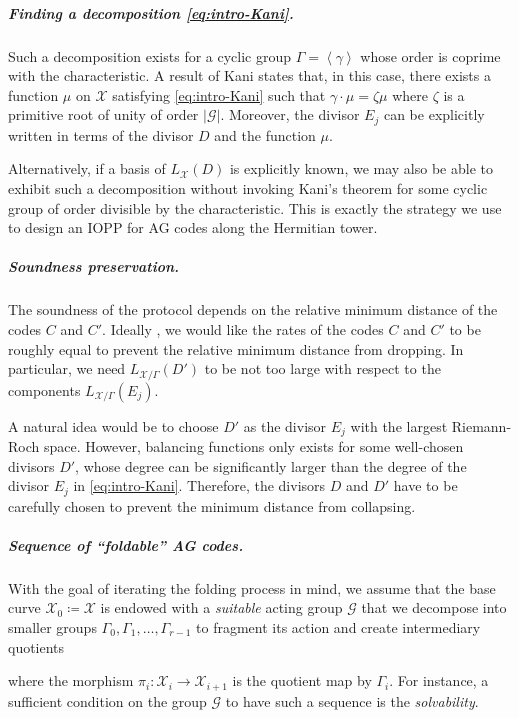 \documentclass[10pt,a4paper]{article}
\newcommand\gen[1]{\left\langle #1 \right\rangle}
\newcommand{\size}[1]{\left|#1\right|}
\newcommand\calX{\mathcal{X}}
\newcommand\calG{\mathcal{G}}
\newcommand\mydef{\coloneqq}
\theoremstyle{plain}
\theoremstyle{plain}
\theoremstyle{definition}
\theoremstyle{remark}
\theoremstyle{plain}
\begin{document}
\subparagraph*{Finding a decomposition \eqref{eq:intro-Kani}.}

Such a decomposition exists for a cyclic group $\Gamma=\gen{\gamma}$ whose order is coprime with the characteristic. A result of Kani \cite{Kani}  states that, in this case, there exists a function $\mu$ on $\calX$ satisfying \eqref{eq:intro-Kani} such that $\gamma\cdot \mu = \zeta \mu$ where $\zeta$ is a primitive root of unity of order $\size{\calG}$. Moreover, the divisor $E_{j}$ can be explicitly written in terms of the divisor $D$ and the function $\mu$.

Alternatively, if a basis of $L_\calX(D)$ is explicitly known, we may also be able to exhibit such a decomposition without invoking Kani's theorem for some cyclic group of order divisible by the characteristic. This is exactly the strategy we use to design an IOPP for AG codes along the Hermitian tower.


\subparagraph*{Soundness preservation.}


The soundness of the protocol depends on the relative minimum distance of the codes $C$ and $C'$. Ideally , we would like the rates of the codes $C$ and $C'$ to be roughly equal to prevent the relative minimum distance from dropping. In particular, we need $L_{\calX/\Gamma}(D')$ to be not too large with respect to the components $L_{\calX/\Gamma}(E_j)$.


A natural idea would be to choose $D'$ as the divisor $E_j$ with the largest Riemann-Roch space. However, balancing functions only exists for some well-chosen divisors $D'$, whose degree can be significantly larger than the degree of the divisor $E_{j}$ in \eqref{eq:intro-Kani}. Therefore, the divisors $D$ and $D'$ have to be carefully chosen to prevent the minimum distance from collapsing.

\subparagraph*{Sequence of ``foldable'' AG codes.} With the goal of iterating the folding process in mind, we assume that the base curve $\calX_0 \mydef \calX$ is endowed with a \emph{suitable} acting group $\calG$ that we decompose into smaller groups $\Gamma_0, \Gamma_1, \dots, \Gamma_{r-1}$ to fragment its action and create intermediary quotients
\begin{center}
\end{center}
where the morphism $\pi_i:\calX_i \rightarrow \calX_{i+1}$ is the quotient map by $\Gamma_i$.
For instance, a sufficient condition on the group $\calG$ to have such a sequence is the \emph{solvability}. 
\end{document}
